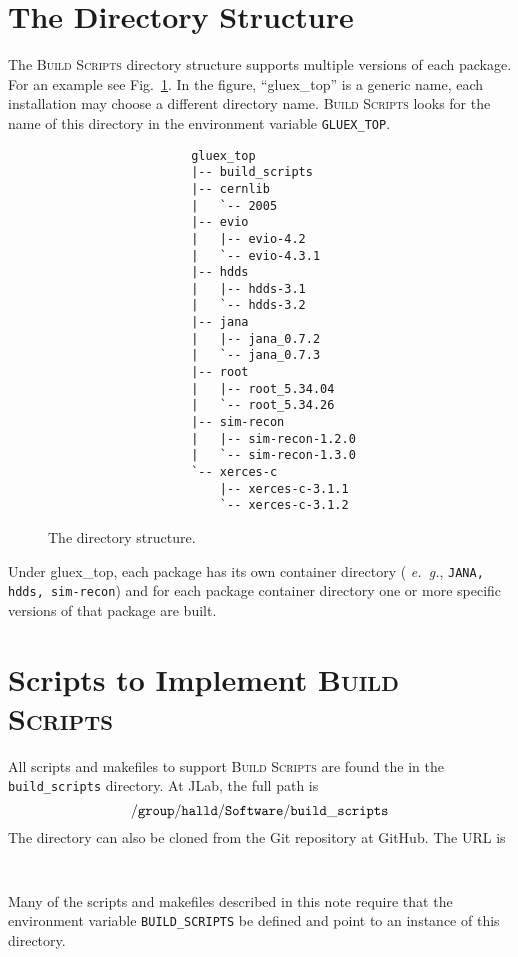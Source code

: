 \documentclass[12pt]{article}
\newcommand{\bs}{\textsc{Build Scripts}}
\begin{document}
\section{The Directory Structure}\label{section:directory}

The \bs{} directory structure supports multiple versions of each
package. For an example see Fig.~\ref{fig:directory-tree}. In the
figure, ``gluex\_top'' is a generic name, each installation may choose
a different directory name. \bs{} looks for the name of this directory
in the environment variable {\tt GLUEX\_TOP}.

\begin{figure}
\begin{verbatim}
                    gluex_top
                    |-- build_scripts
                    |-- cernlib
                    |   `-- 2005
                    |-- evio
                    |   |-- evio-4.2
                    |   `-- evio-4.3.1
                    |-- hdds
                    |   |-- hdds-3.1
                    |   `-- hdds-3.2
                    |-- jana
                    |   |-- jana_0.7.2
                    |   `-- jana_0.7.3
                    |-- root
                    |   |-- root_5.34.04
                    |   `-- root_5.34.26
                    |-- sim-recon
                    |   |-- sim-recon-1.2.0
                    |   `-- sim-recon-1.3.0
                    `-- xerces-c
                        |-- xerces-c-3.1.1
                        `-- xerces-c-3.1.2
\end{verbatim}
\caption{The directory structure.}\label{fig:directory-tree}
\end{figure}

Under gluex\_top, each package has its own container directory ({\it
  e.~g.}, {\tt JANA, hdds, sim-recon}) and for each package container
directory one or more specific versions of that package are built.

\section{Scripts to Implement \bs{}}

All scripts and makefiles to support \bs{} are found the in the {\tt
  build\_scripts} directory. At JLab, the full path is
$${\tt /group/halld/Software/build\_scripts}$$
The directory can also be cloned from the Git repository at GitHub. The URL is
\begin{center}\tt 
\end{center}
Many of the scripts and makefiles described in this note require that
the environment variable {\tt BUILD\_SCRIPTS} be defined and point to
an instance of this directory.
\end{document}
